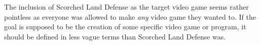 The inclusion of Scorched Land Defense as the target video game seems rather pointless as everyone was allowed to make \textit{any} video game they wanted to.
If the goal is supposed to be the creation of some specific video game or program, it should be defined in less vague terms than Scorched Land Defense was.